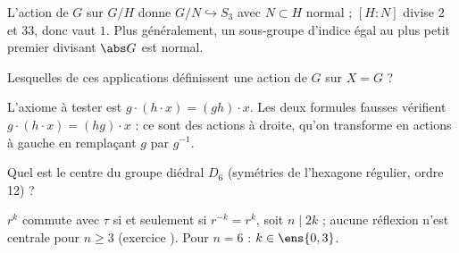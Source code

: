 \begin{qcm}
\begin{question}
\begin{explication}
L'action de $G$ sur $G/H$ donne $G/N\hookrightarrow S_3$ avec $N\subset H$ normal ; $[H:N]$ divise $2$ et $33$, donc vaut $1$. Plus généralement, un sous-groupe d'indice égal au plus petit premier divisant $\abs G$ est normal.
\end{explication}
\end{question}
\begin{question}[plusieurs]
Lesquelles de ces applications définissent une action de $G$ sur $X=G$ ?
\begin{explication}
L'axiome à tester est $g\cdot(h\cdot x)=(gh)\cdot x$. Les deux formules fausses vérifient $g\cdot(h\cdot x)=(hg)\cdot x$ : ce sont des actions à droite, qu'on transforme en actions à gauche en remplaçant $g$ par $g^{-1}$.
\end{explication}
\end{question}
\begin{question}
Quel est le centre du groupe diédral $D_6$ (symétries de l'hexagone régulier, ordre 12) ?
\begin{explication}
$r^k$ commute avec $\tau$ si et seulement si $r^{-k}=r^k$, soit $n\mid2k$ ; aucune réflexion n'est centrale pour $n\ge3$ (exercice ). Pour $n=6$ : $k\in\ens{0,3}$.
\end{explication}
\end{question}
\end{qcm}

